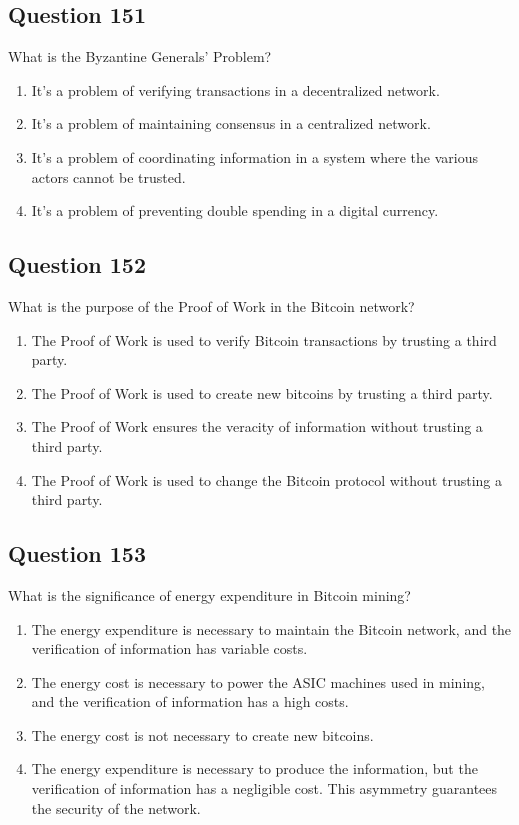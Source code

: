 \documentclass[12pt,a4paper]{article}
\begin{document}
\bigskip


\subsection*{Question 151}
What is the Byzantine Generals' Problem?

\begin{enumerate}[label=\Alph*., leftmargin=*]
\item It's a problem of verifying transactions in a decentralized network.
\item It's a problem of maintaining consensus in a centralized network.
\item It's a problem of coordinating information in a system where the various actors cannot be trusted.
\item It's a problem of preventing double spending in a digital currency.
\end{enumerate}

\bigskip


\subsection*{Question 152}
What is the purpose of the Proof of Work in the Bitcoin network?

\begin{enumerate}[label=\Alph*., leftmargin=*]
\item The Proof of Work is used to verify Bitcoin transactions by trusting a third party.
\item The Proof of Work is used to create new bitcoins by trusting a third party.
\item The Proof of Work ensures the veracity of information without trusting a third party.
\item The Proof of Work is used to change the Bitcoin protocol without trusting a third party.
\end{enumerate}

\bigskip


\subsection*{Question 153}
What is the significance of energy expenditure in Bitcoin mining?

\begin{enumerate}[label=\Alph*., leftmargin=*]
\item The energy expenditure is necessary to maintain the Bitcoin network, and the verification of information has variable costs.
\item The energy cost is necessary to power the ASIC machines used in mining, and the verification of information has a high costs.
\item The energy cost is not necessary to create new bitcoins.
\item The energy expenditure is necessary to produce the information, but the verification of information has a negligible cost. This asymmetry guarantees the security of the network.
\end{enumerate}
\end{document}
